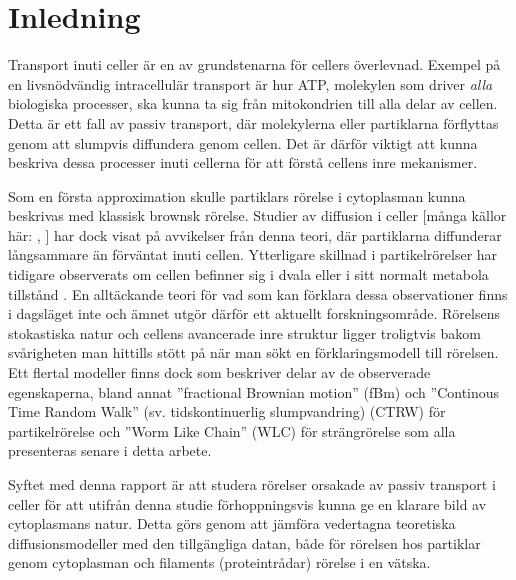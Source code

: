 \chapter{Inledning}



Transport inuti celler är en av grundstenarna för cellers överlevnad. Exempel på en livsnödvändig intracellulär transport är hur ATP, molekylen som driver \emph{alla} biologiska processer, ska kunna ta sig från mitokondrien till alla delar av cellen. Detta är ett fall av passiv transport, där molekylerna eller partiklarna förflyttas genom att slumpvis diffundera genom cellen. Det är därför viktigt att kunna beskriva dessa processer inuti cellerna för att förstå cellens inre mekanismer. 


Som en första approximation skulle partiklars rörelse i cytoplasman kunna beskrivas med klassisk brownsk rörelse. Studier av diffusion i celler [många källor här: \cite{Gou_etal2014}, \cite{Dix_Crowdingeffects2008}] har dock visat på avvikelser från denna teori, där partiklarna diffunderar långsammare än förväntat inuti cellen. Ytterligare skillnad i partikelrörelser har tidigare observerats om cellen befinner sig i dvala eller i sitt normalt metabola tillstånd \cite{}. En alltäckande teori för vad som kan förklara dessa observationer finns i dagsläget inte och ämnet utgör därför ett aktuellt forskningsområde.
Rörelsens stokastiska natur och cellens avancerade inre struktur ligger troligtvis bakom svårigheten man hittills stött på när man sökt en förklaringsmodell till rörelsen. Ett flertal modeller finns dock som beskriver delar av de observerade egenskaperna, bland annat ''fractional Brownian motion'' (fBm) \cite{Mandelbrot_fBm1968} och ''Continous Time Random Walk'' (sv. tidskontinuerlig slumpvandring) (CTRW) \cite{} för partikelrörelse och ''Worm Like Chain'' (WLC) \cite{} för strängrörelse som alla presenteras senare i detta arbete.

Syftet med denna rapport är att studera rörelser orsakade av passiv transport i celler för att utifrån denna studie förhoppningsvis kunna ge en klarare bild av cytoplasmans natur. Detta görs genom att jämföra vedertagna teoretiska diffusionsmodeller med den tillgängliga datan, både för rörelsen hos partiklar genom cytoplasman och filaments (proteintrådar) rörelse i en vätska. %


